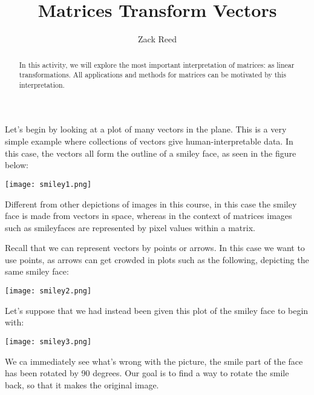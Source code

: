 \documentclass{ximera}
\author{Zack Reed}
\title{Matrices Transform Vectors}
\begin{document}
\begin{abstract}
In this activity, we will explore the most important interpretation of matrices: as linear transformations. All applications and methods for matrices can be motivated by this interpretation.
\end{abstract}
\maketitle

\begin{exploration}

    Let's begin by looking at a plot of many vectors in the plane. This is a very simple example where collections of vectors give human-interpretable data. In this case, the vectors all form the outline of a smiley face, as seen in the figure below:

    \begin{center}
        \texttt{[image: smiley1.png]}
    \end{center}

    \begin{remark}

        Different from other depictions of images in this course, in this case the smiley face is made from vectors in space, whereas in the context of matrices images such as smileyfaces are represented by pixel values within a matrix.

        Recall that we can represent vectors by points or arrows. In this case we want to use points, as arrows can get crowded in plots such as the following, depicting the same smiley face:

        \begin{center}
            \texttt{[image: smiley2.png]}
        \end{center}

    \end{remark}


        Let's suppose that we had instead been given this plot of the smiley face to begin with:

        \begin{center}
            \texttt{[image: smiley3.png]}
        \end{center}

        We ca immediately see what's wrong with the picture, the smile part of the face has been rotated by 90 degrees. Our goal is to find a way to rotate the smile back, so that it makes the original image.


\end{exploration}
\end{document}
